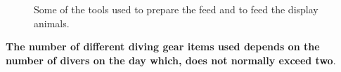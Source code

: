 \documentclass[
  12pt,
]{report}
\begin{document}
\begin{figure}[H]

\begin{minipage}[t]{0.33\linewidth}

{\centering 


}

\end{minipage}%
%
\begin{minipage}[t]{0.33\linewidth}

{\centering 


}

\end{minipage}%
%
\begin{minipage}[t]{0.33\linewidth}

{\centering 


}

\end{minipage}%

\caption{\label{fig-feed-tools}Some of the tools used to prepare the
feed and to feed the display animals.}

\end{figure}

\textbf{The number of different diving gear items used depends on the
number of divers on the day which, does not normally exceed two}.
\end{document}
